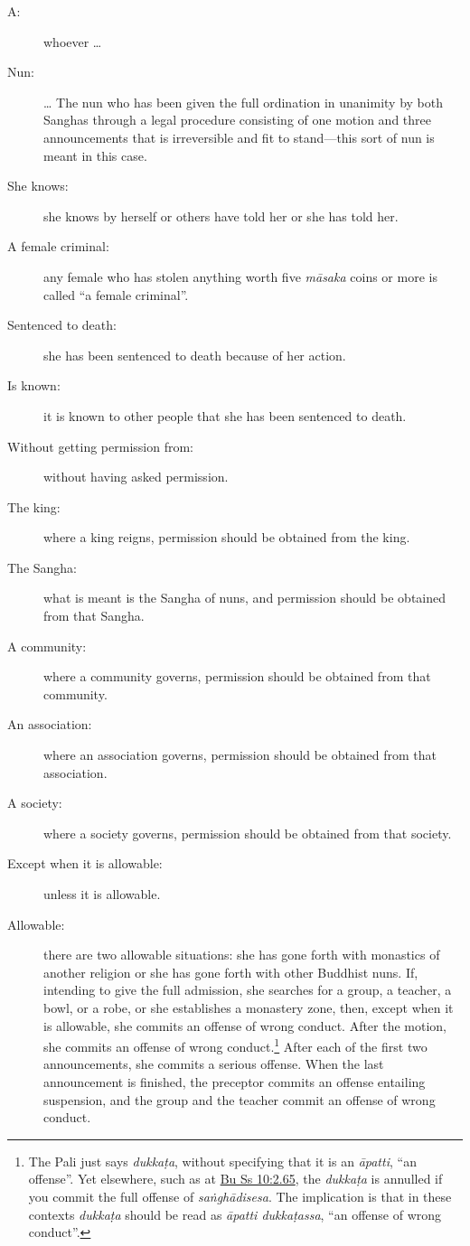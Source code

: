 \documentclass[12pt,openany]{book}%
\begin{document}
\begin{description}%
\item[A: ] whoever … %
\item[Nun: ] … The nun who has been given the full ordination in unanimity by both Sanghas through a legal procedure consisting of one motion and three announcements that is irreversible and fit to stand—this sort of nun is meant in this case. %
\item[She knows: ] she knows by herself or others have told her or she has told her. %
\item[A female criminal: ] any female who has stolen anything worth five \textit{\textsanskrit{māsaka}} coins or more is called “a female criminal”. %
\item[Sentenced to death: ] she has been sentenced to death because of her action. %
\item[Is known: ] it is known to other people that she has been sentenced to death. %
\item[Without getting permission from: ] without having asked permission. %
\item[The king: ] where a king reigns, permission should be obtained from the king. %
\item[The Sangha: ] what is meant is the Sangha of nuns, and permission should be obtained from that Sangha. %
\item[A community: ] where a community governs, permission should be obtained from that community. %
\item[An association: ] where an association governs, permission should be obtained from that association. %
\item[A society: ] where a society governs, permission should be obtained from that society. %
\item[Except when it is allowable: ] unless it is allowable. %
\item[Allowable: ] there are two allowable situations: she has gone forth with monastics of another religion or she has gone forth with other Buddhist nuns. If, intending to give the full admission, she searches for a group, a teacher, a bowl, or a robe, or she establishes a monastery zone, then, except when it is allowable, she commits an offense of wrong conduct. After the motion, she commits an offense of wrong conduct.\footnote{The Pali just says \textit{\textsanskrit{dukkaṭa}}, without specifying that it is an \textit{\textsanskrit{āpatti}}, “an offense”. Yet elsewhere, such as at \href{https://suttacentral.net/pli-tv-bu-vb-ss10/en/brahmali\#2.65}{Bu Ss 10:2.65}, the \textit{\textsanskrit{dukkaṭa}} is annulled if you commit the full offense of \textit{\textsanskrit{saṅghādisesa}}. The implication is that in these contexts \textit{\textsanskrit{dukkaṭa}} should be read as \textit{\textsanskrit{āpatti} \textsanskrit{dukkaṭassa}}, “an offense of wrong conduct”. } After each of the first two announcements, she commits a serious offense. When the last announcement is finished, the preceptor commits an offense entailing suspension, and the group and the teacher commit an offense of wrong conduct. %

\end{description}
\end{document}
